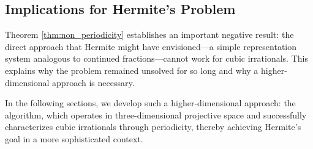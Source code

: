 \subsection{Implications for Hermite's Problem}

Theorem \ref{thm:non_periodicity} establishes an important negative result: the direct approach that Hermite might have envisioned—a simple representation system analogous to continued fractions—cannot work for cubic irrationals. This explains why the problem remained unsolved for so long and why a higher-dimensional approach is necessary.

In the following sections, we develop such a higher-dimensional approach: the \HAPD{} algorithm, which operates in three-dimensional projective space and successfully characterizes cubic irrationals through periodicity, thereby achieving Hermite's goal in a more sophisticated context.
